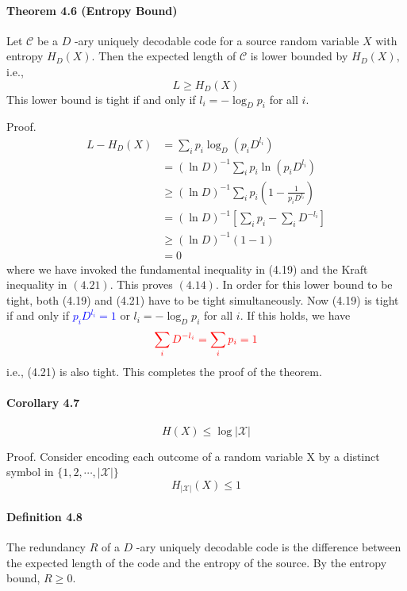 \documentclass[8pt]{article}
\begin{document}
\begin{tcolorbox}
\paragraph{Theorem 4.6 (Entropy Bound)} Let $\mathcal{C}$ be a $D$ -ary uniquely decodable code for a source random variable $X$ with entropy $H_{D}(X) .$ Then the expected length of $\mathcal{C}$ is lower bounded by $H_{D}(X),$ i.e.,
$$
L \geq H_{D}(X)
$$
This lower bound is tight if and only if $l_{i}=-\log _{D} p_{i}$ for all $i$.
\end{tcolorbox}
Proof.
$$
\begin{aligned}
L-H_{D}(X) &=\sum_{i} p_{i} \log _{D}\left(p_{i} D^{l_{i}}\right) \\
&=(\ln D)^{-1} \sum_{i} p_{i} \ln \left(p_{i} D^{l_{i}}\right) \\
& \geq(\ln D)^{-1} \sum_{i} p_{i}\left(1-\frac{1}{p_{i} D^{l_{i}}}\right) \\
&=(\ln D)^{-1}\left[\sum_{i} p_{i}-\sum_{i} D^{-l_{i}}\right] \\
& \geq(\ln D)^{-1}(1-1) \\
&=0
\end{aligned}
$$
where we have invoked the fundamental inequality in (4.19) and the Kraft inequality in $(4.21) .$ This proves $(4.14) .$ In order for this lower bound to be tight, both (4.19) and (4.21) have to be tight simultaneously. Now (4.19) is tight if and only if \textcolor{blue}{$p_{i} D^{l_{i}}=1$} or $l_{i}=-\log _{D} p_{i}$ for all $i .$ If this holds, we have
$$
\color{red} \sum_{i} D^{-l_{i}}=\sum_{i} p_{i}=1
$$
i.e., (4.21) is also tight. This completes the proof of the theorem.
\begin{tcolorbox}
\paragraph{Corollary 4.7} 
$$ H(X) \leq \log |\mathcal{X}| $$
\end{tcolorbox}
Proof. Consider encoding each outcome of a random variable X by a distinct
symbol in $\{1,2, \cdots,|\mathcal{X}|\}$
$$
H_{|\mathcal{X}|}(X) \leq 1
$$

\paragraph{Definition 4.8} The redundancy $R$ of a $D$ -ary uniquely decodable code is the difference between the expected length of the code and the entropy of the source.
By the entropy bound, $R \geq 0 .$
\end{document}
